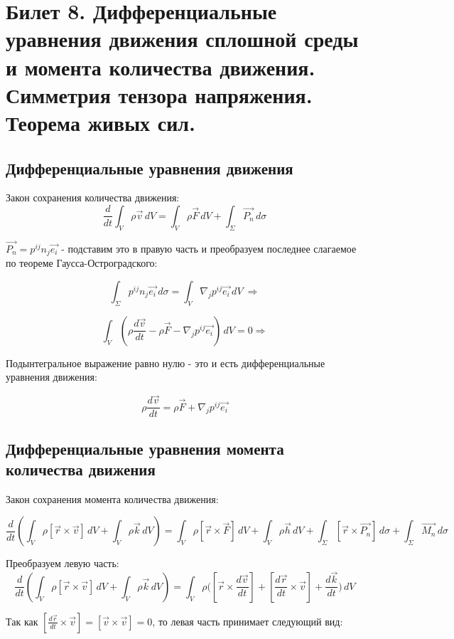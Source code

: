 \newpage
\section{Билет 8. Дифференциальные уравнения движения сплошной среды и момента количества движения. Симметрия тензора напряжения. Теорема живых сил.}
\subsection{Дифференциальные уравнения движения}
Закон сохранения количества движения: 
$$\frac{d}{dt}  \int_{V} \rho \vec{v} \,dV =  \int_{V} \rho \vec{F} \,dV  + \int_{\Sigma} \vec{P_n} \,d\sigma $$

$\vec{P_n} =  p^{ij}n_j \vec{e_i}$ - подставим это в правую часть и преобразуем последнее слагаемое по теореме Гаусса-Остроградского: 



$$\int_{\Sigma} p^{ij}n_j \vec{e_i} \,d\sigma = \int_{V} \nabla_j p^{ij} \vec{e_i}  \,dV \ \Rightarrow$$

 $$\int_{V} (\rho \frac{d \vec{v}}{dt} -  \rho \vec{F}   -  \nabla_j p^{ij} \vec{e_i} ) \,dV = 0 \Rightarrow$$

Подынтегральное выражение равно нулю - это и есть дифференциальные уравнения движения: 

$$\rho \frac{d \vec{v}}{dt} =  \rho \vec{F}   +  \nabla_j p^{ij} \vec{e_i} $$

\subsection{Дифференциальные уравнения момента количества движения}
Закон сохранения момента количества движения: 

$$\frac{d}{dt} ( \int_{V} \rho [\vec{r} \times \vec{v}] \,dV +   \int_{V} \rho \vec{k} \,dV )  =  \int_{V} \rho [\vec{r} \times \vec{F}] \,dV  +  \int_{V} \rho \vec{h} \,dV + \int_{\Sigma} [\vec{r} \times \vec{P_n}] \,d\sigma + \int_{\Sigma} \vec{M_n} \,d\sigma $$

Преобразуем левую часть: 
$$\frac{d}{dt} ( \int_{V} \rho [\vec{r} \times \vec{v}] \,dV +   \int_{V} \rho \vec{k} \,dV ) = \int_{V} \rho ([\vec{r} \times \frac{d\vec{v}}{dt}] + [\frac{d\vec{r}}{dt} \times \vec{v}] +  \frac{d \vec{k}}{dt} \big ) \,dV  $$

Так как  $[\frac{d\vec{r}}{dt} \times \vec{v}] =  [\vec{v} \times \vec{v}] = 0$, то левая часть принимает следующий вид: 

